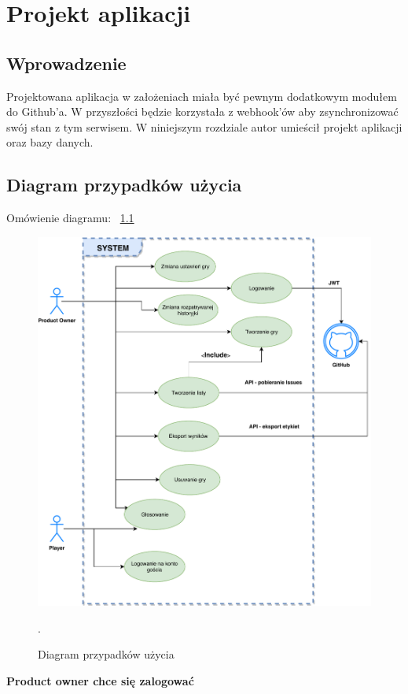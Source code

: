 \chapter{Projekt aplikacji}

\section{Wprowadzenie}

Projektowana aplikacja w założeniach miała być pewnym dodatkowym modułem do Github'a.
W przyszłości będzie korzystała z webhook'ów aby zsynchronizować swój stan z tym serwisem.
W niniejszym rozdziale autor umieścił projekt aplikacji oraz bazy danych.

\section{Diagram przypadków użycia}

Omówienie diagramu: 
~\ref{rys:useCase}

\begin{figure}
	\centering\includegraphics[width=.9\textwidth]{img/useCase}
	\caption{Diagram przypadków użycia}.
	\label{rys:useCase}
\end{figure}

\textbf{Product owner chce się zalogować}


